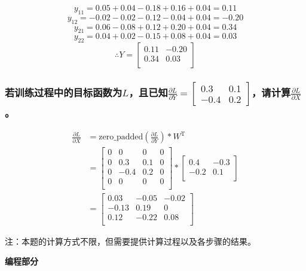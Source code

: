 \documentclass[a4paper]{article}
\begin{document}
\[y_{11} = 0.05 + 0.04 - 0.18 + 0.16 + 0.04 = 0.11\]
\[y_{12} = -0.02 - 0.02 - 0.12 - 0.04 + 0.04 = -0.20\]
\[y_{21} = 0.06 - 0.08 + 0.12 + 0.20 + 0.04 = 0.34\]
\[y_{22} = 0.04 + 0.02 - 0.15 + 0.08 + 0.04 = 0.03\]
\[\therefore Y = \begin{bmatrix}
                0.11 & -0.20 \\
                0.34 & 0.03 \\
                \end{bmatrix}\]

\subsubsection{若训练过程中的目标函数为$L$，且已知$\frac{\partial L}{\partial Y}=\left[ \begin{array}{cc}
    0.3 & 0.1 \\
    -0.4 & 0.2
\end{array} \right]$，请计算$\frac{\partial L}{\partial X}$。
}
\begin{align*}
    \frac{\partial L}{\partial X} &= \mathrm{zero\_padded}(\frac{\partial L}{\partial Y}) * W^{\mathrm{T}} \\
    &= \begin{bmatrix}
        0 & 0 & 0 & 0 \\
        0 & 0.3 & 0.1 & 0 \\
        0 & -0.4 & 0.2 & 0 \\
        0 & 0 & 0 & 0 \\
    \end{bmatrix} *
    \begin{bmatrix}
        0.4 & -0.3 \\
        -0.2 & 0.1 \\
    \end{bmatrix} \\
    &= \begin{bmatrix}
        0.03 & -0.05 & -0.02 \\
        -0.13 & 0.19 & 0 \\
        0.12 & -0.22 & 0.08 \\
    \end{bmatrix}
\end{align*}

注：本题的计算方式不限，但需要提供计算过程以及各步骤的结果。
\vspace{6mm}

\centerline{\textbf{\Large{编程部分}}}
\vspace{3mm}
\end{document}

